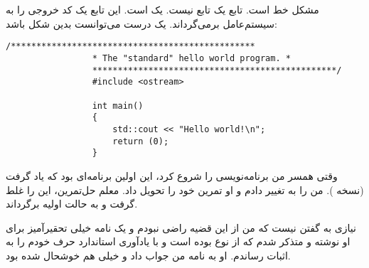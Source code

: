 \section{}
\paragraph{}\label{answer:6}
مشکل خط  است. تابع  یک تابع  نیست. یک  است. این تابع یک کد خروجی را به سیستم‌عامل برمی‌گرداند. یک  درست می‌توانست بدین شکل باشد:

\begin{LTR}
            \begin{lstlisting}[style=C++Style]
                 /************************************************
                 * The "standard" hello world program. *
                 ************************************************/
                 #include <ostream>

                 int main()
                 {
                     std::cout << "Hello world!\n";
                     return (0);
                 }
            \end{lstlisting}
\end{LTR}
وقتی همسر من برنامه‌نویسی را شروع کرد، این اولین برنامه‌ای بود که یاد گرفت (نسخه ). من  را به  تغییر دادم و او تمرین خود را تحویل داد. معلم حل‌تمرین، این را غلط گرفت و به حالت اولیه برگرداند.

نیازی به گفتن نیست که من از این قضیه راضی نبودم و یک نامه خیلی تحقیرآمیز برای او نوشته و متذکر شدم که  از نوع  بوده است و با یادآوری استاندارد  حرف خودم را به اثبات رساندم. او به نامه من جواب داد و خیلی هم خوشحال شده بود.